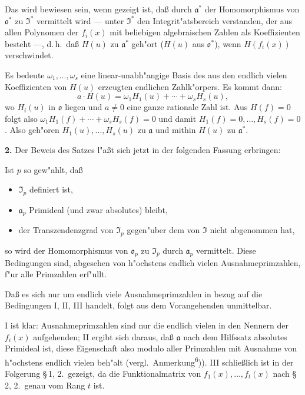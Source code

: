 Das wird bewiesen sein, wenn gezeigt ist, da\ss{} durch $\mathfrak{a}^*$ der Homomorphismus von $\mathfrak{o}^*$ zu $\mathfrak{I}^*$ vermittelt wird --- unter $\mathfrak{I}^*$ den Integrit"atsbereich verstanden, der aus allen Polynomen der $f_i(x)$ mit beliebigen algebraischen Zahlen als Koeffizienten besteht ---, d.\,h.\ da\ss{} $H(u)$ zu $\mathfrak{a}^*$ geh"ort ($H(u)$ aus $\mathfrak{o}^*$), wenn $H(f_i(x))$ verschwindet.

Es bedeute $\omega_1,\ldots,\omega_s$ eine linear-unabh"angige Basis des aus den endlich vielen Koeffizienten von $H(u)$ erzeugten endlichen Zahlk"orpers. Es kommt dann:
\[
a \cdot H(u) = \omega_1 H_1(u) + \cdots + \omega_s H_s(u),
\]
wo $H_i(u)$ in $\mathfrak{o}$ liegen und $a \neq 0$ eine ganze rationale Zahl ist. Aus $H(f) = 0$ folgt also $\omega_1 H_1(f) + \cdots + \omega_s H_s(f) = 0$ und damit $H_1(f) = 0,\ldots, H_s(f) = 0$. Also geh"oren $H_1(u),\ldots,H_s(u)$ zu $\mathfrak{a}$ und mithin $H(u)$ zu $\mathfrak{a}^*$.

\medskip\noindent\textbf{2.}
Der Beweis des Satzes l"a\ss t sich jetzt in der folgenden Fassung erbringen:

Ist $p$ so gew"ahlt, da\ss
\begin{itemize}
\item[I.] $\mathfrak{I}_p$ definiert ist,
\item[II.] $\mathfrak{a}_p$ Primideal (und zwar absolutes) bleibt,
\item[III.] der Transzendenzgrad von $\mathfrak{I}_p$ gegen"uber dem von $\mathfrak{I}$ nicht abgenommen hat,
\end{itemize}
so wird der Homomorphismus von $\mathfrak{o}_p$ zu $\mathfrak{I}_p$ durch $\mathfrak{a}_p$ vermittelt. Diese Bedingungen sind, abgesehen von h"ochstens endlich vielen Ausnahmeprimzahlen, f"ur alle Primzahlen erf"ullt.

Da\ss{} es sich nur um endlich viele Ausnahmeprimzahlen in bezug auf die Bedingungen I, II, III handelt, folgt aus dem Vorangehenden unmittelbar.

I ist klar: Ausnahmeprimzahlen sind nur die endlich vielen in den Nennern der $f_i(x)$ aufgehenden; II ergibt sich daraus, da\ss{} $\mathfrak{a}$ nach dem Hilfssatz absolutes Primideal ist, diese Eigenschaft also modulo aller Primzahlen mit Ausnahme von h"ochstens endlich vielen beh"alt (vergl.\ Anmerkung\textsuperscript{6})). III schlie\ss lich ist in der Folgerung \S\,1, 2.\ gezeigt, da die Funktionalmatrix von $f_1(x),\ldots,f_t(x)$ nach \S\,2, 2.\ genau vom Rang $t$ ist.

